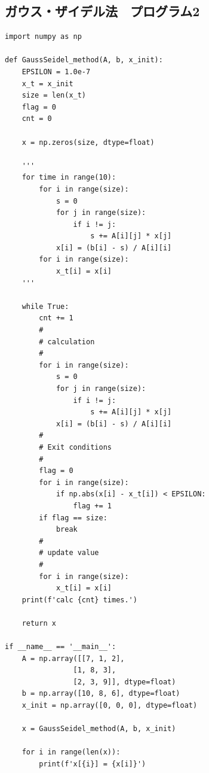 \documentclass[a4paper, titlepage]{jsarticle}
\begin{document}
		\subsection{ガウス・ザイデル法　プログラム2}
			\begin{lstlisting}
import numpy as np

def GaussSeidel_method(A, b, x_init):
    EPSILON = 1.0e-7
    x_t = x_init
    size = len(x_t)
    flag = 0
    cnt = 0

    x = np.zeros(size, dtype=float)
    
    '''
    for time in range(10):
        for i in range(size):
            s = 0
            for j in range(size):
                if i != j:
                    s += A[i][j] * x[j]
            x[i] = (b[i] - s) / A[i][i]
        for i in range(size):
            x_t[i] = x[i]
    '''

    while True:
        cnt += 1
        #
        # calculation
        #
        for i in range(size):
            s = 0
            for j in range(size):
                if i != j:
                    s += A[i][j] * x[j]
            x[i] = (b[i] - s) / A[i][i]
        #
        # Exit conditions
        #
        flag = 0
        for i in range(size):
            if np.abs(x[i] - x_t[i]) < EPSILON:
                flag += 1
        if flag == size:
            break
        #
        # update value
        #
        for i in range(size):
            x_t[i] = x[i]
    print(f'calc {cnt} times.')

    return x

if __name__ == '__main__':
    A = np.array([[7, 1, 2],
                [1, 8, 3],
                [2, 3, 9]], dtype=float)
    b = np.array([10, 8, 6], dtype=float)
    x_init = np.array([0, 0, 0], dtype=float)

    x = GaussSeidel_method(A, b, x_init)

    for i in range(len(x)):
        print(f'x[{i}] = {x[i]}')
			\end{lstlisting}
\end{document}
